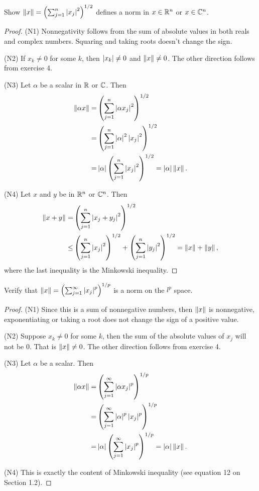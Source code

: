 \begin{exercise}{5}
Show $\left\lVert x\right\rVert= \left(\sum_{j=1}^n\left\lvert x_j\right\rvert^2\right)^{1/2}$ defines a norm in $x\in\mathbb{R}^n$ or $x\in\mathbb{C}^n$.
\end{exercise}
\begin{proof}
(N1) Nonnegativity follows from the sum of absolute values in both reals and complex numbers. Squaring and taking roots doesn't change the sign.

(N2) If $x_k\neq 0$ for some $k$, then $\left\lvert x_k\right\rvert\neq 0$ and $\left\lVert x\right\rVert\neq 0$. The other direction follows from exercise 4.

(N3) Let $\alpha$ be a scalar in $\mathbb{R}$ or $\mathbb{C}$. Then 
\begin{align*}
    \left\lVert \alpha x\right\rVert =&
    \left(\sum_{j=1}^n\left\lvert \alpha x_j\right\rvert^2\right)^{1/2}\\
    =& \left(\sum_{j=1}^n\left\lvert \alpha\right\rvert^2\left\lvert  x_j\right\rvert^2\right)^{1/2}\\
    =& \left\lvert \alpha\right\rvert\left(\sum_{j=1}^n\left\lvert  x_j\right\rvert^2\right)^{1/2} =\left\lvert \alpha\right\rvert\left\lVert x\right\rVert.
\end{align*}

(N4) Let $x$ and $y$ be in $\mathbb{R}^n$ or $\mathbb{C}^n$. Then
\begin{align*}
    \left\lVert x+y\right\rVert =& 
    \left(\sum_{j=1}^n\left\lvert x_j+y_j\right\rvert^2\right)^{1/2}\\
    \leq& \left(\sum_{j=1}^n\left\lvert x_j\right\rvert^2\right)^{1/2}
    +\left(\sum_{j=1}^n\left\lvert y_j\right\rvert^2\right)^{1/2}
    = \left\lVert x\right\rVert+\left\lVert y\right\rVert,
\end{align*}
where the last inequality is the Minkowski inequality.
\end{proof}

\begin{exercise}{7}
Verify that $\left\lVert x\right\rVert= \left(\sum_{j=1}^\infty\left\lvert x_j\right\rvert^p\right)^{1/p}$ is a norm on the $l^p$ space.
\end{exercise}
\begin{proof}
(N1) Since this is a sum of nonnegative numbers, then $\left\lVert x\right\rVert$ is nonnegative, exponentiating or taking a root does not change the sign of a positive value.

(N2) Suppose $x_k\neq 0$ for some $k$, then the sum of the absolute values  of $x_j$ will not be 0. That is $\left\lVert x\right\rVert\neq 0$. The other direction follows from exercise 4.

(N3) Let $\alpha$ be a scalar. Then
\begin{align*}
    \left\lVert \alpha x\right\rVert =& 
    \left(\sum_{j=1}^\infty\left\lvert \alpha x_j\right\rvert^p\right)^{1/p}\\
    =& \left(\sum_{j=1}^\infty\left\lvert \alpha\right\rvert^p\left\lvert x_j\right\rvert^p\right)^{1/p}\\
    =& \left\lvert \alpha\right\rvert\left(\sum_{j=1}^\infty\left\lvert x_j\right\rvert^p\right)^{1/p}
    =\left\lvert \alpha\right\rvert\left\lVert x\right\rVert.
\end{align*}

(N4) This is exactly the content of Minkowski inequality (see equation 12 on Section 1.2).
\end{proof}

